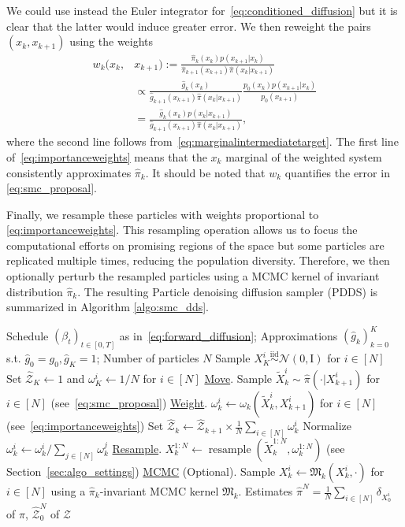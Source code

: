 \documentclass{article}
\theoremstyle{plain}
\theoremstyle{definition}
\theoremstyle{remark}
\begin{document}
We could use instead the Euler integrator for~\eqref{eq:conditioned_diffusion} but it is clear that the latter would induce greater error.
We then reweight the pairs $(x_k, x_{k+1})$ using the weights
\begin{align}
	w_k(x_{k}, & x_{k+1}) := \frac{\hat \pi_k(x_k) p(x_{k+1}|x_k)}{\hat \pi_{k+1}(x_{k+1}) \hat \pi(x_k|x_{k+1})} \nonumber                       \\
	           & \propto \frac{\hat g_k(x_k)}{\hat g_{k+1}(x_{k+1}) \hat \pi(x_k|x_{k+1})} \frac{p_0(x_k) p(x_{k+1}|x_k)}{p_0(x_{k+1})} \nonumber \\
	           & =\frac{\hat g_k(x_k) p(x_k|x_{k+1})}{\hat g_{k+1}(x_{k+1}) \hat \pi(x_k|x_{k+1})} , \label{eq:importanceweights}
\end{align}
where the second line follows from~\eqref{eq:marginalintermediatetarget}.
The first line of~\eqref{eq:importanceweights} means that the $x_k$ marginal of the weighted system consistently approximates $\hat \pi_k$. It should be noted that $w_k$ quantifies the error in \eqref{eq:smc_proposal}.

Finally, we resample these particles with weights proportional to \eqref{eq:importanceweights}. This resampling operation allows us to focus the computational efforts on promising regions of the space but some particles are replicated multiple times, reducing the population diversity. Therefore, we then optionally perturb the resampled particles using a MCMC kernel of invariant distribution $\hat \pi_k$. The resulting Particle denoising diffusion sampler (PDDS) is summarized in Algorithm \ref{algo:smc_dds}.

\newcommand{\hmc}{\hat {\mathcal Z}}
\begin{algorithm}[tb]
	\caption{Particle Denoising Diffusion Sampler}
	\label{algo:smc_dds}
	\begin{algorithmic}
		\REQUIRE Schedule $(\beta_t)_{t \in [0,T]}$ as in~\eqref{eq:forward_diffusion}; Approximations $(\hat g_k)_{k=0}^K$ s.t. $\hat g_0=g_0, \hat g_K = 1$;
		Number of particles $N$
		\STATE Sample $X_K^i \overset{\mathrm{iid}}{\sim} \mathcal N(0, \mathrm{I})$ for $i \in [N]$
		\STATE Set $\hat {\mathcal Z}_K \gets 1$ and $\omega_K^i \gets 1/N$ for $i \in [N]$
		\STATE \underline{Move}. Sample $\tilde X_k^i \sim \hat \pi(\cdot|X_{k+1}^i)$ for $i \in [N]$ (see~\eqref{eq:smc_proposal})
		\STATE \underline{Weight}. $\omega_k^i \gets \omega_k(\tilde X_k^i, X_{k+1}^i)$ for $i \in [N]$ (see~\eqref{eq:importanceweights})
		\STATE Set $\hmc_k \gets \hmc_{k+1} \times \frac 1N \sum_{i\in[N]} \omega_k^i$
		\STATE Normalize $\omega_k^i \gets \omega_k^i/\sum_{j\in[N]} \omega_k^j$
		\STATE \underline{Resample}. $X_k^{1:N} \gets \operatorname{resample}(\tilde X_k^{1:N}, \omega_k^{1:N})$ (see Section~\ref{sec:algo_settings})
		\STATE \underline{MCMC} (Optional). Sample $X_k^i \gets \mathfrak M_k(X_k^i, \cdot)$ for $i\in[N]$ using a $\hat \pi_k$-invariant MCMC kernel $\mathfrak M_k$. %
		\ENDFOR
		\ENSURE Estimates $\hat \pi^N = \frac 1N \sum_{i\in[N]} \delta_{X_0^i}$ of $\pi$, $\hmc^N_0$ of $\mathcal Z$
	\end{algorithmic}
\end{algorithm}
\end{document}
